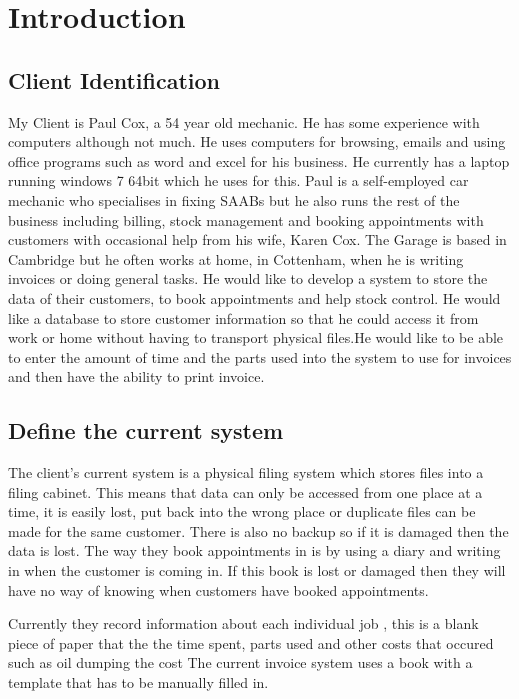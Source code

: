 


\section{Introduction}


	\subsection{Client Identification}

 
		My Client is Paul Cox, a 54 year old mechanic. He has some experience with computers although not much. He uses computers for browsing, emails and using office programs such as word and excel for his business. He currently has a laptop running windows 7 64bit which he uses for this.
		Paul is a self-employed car mechanic who specialises in fixing SAABs but he also runs the rest of the business including billing, stock management and booking appointments with 			customers with occasional help from his wife, Karen Cox. 	
		The Garage is based in Cambridge but he often works at home, in Cottenham, when he is writing invoices or doing general tasks. 
		He would like to develop a system to store the data of their customers, to book appointments and help stock control.  He would like a database to store customer information so 			that he could access it from work or home without having to transport physical files.He would like to be able to enter the amount of time and the parts used into the system to use for invoices and then have the ability to print invoice.
		
	\subsection{Define the current system}

		The client's current system is a physical filing system which stores files into a filing cabinet. This means that data can only be accessed from one place at a time, it is easily lost, 			put back into the wrong place or duplicate files can be made for the same customer.  
		There is also no backup so if it is damaged then the data is lost.  	
		The way they book appointments in is by using a diary and writing in when the customer is coming in. If this book is lost or damaged then they will have no way of knowing when customers have booked appointments. 
		
		Currently they record information about each individual job , this is a blank piece of paper that the the time spent, parts used and other costs that occured such as oil dumping the cost
		The current invoice system uses a book with a template that has to be manually filled in.
		

